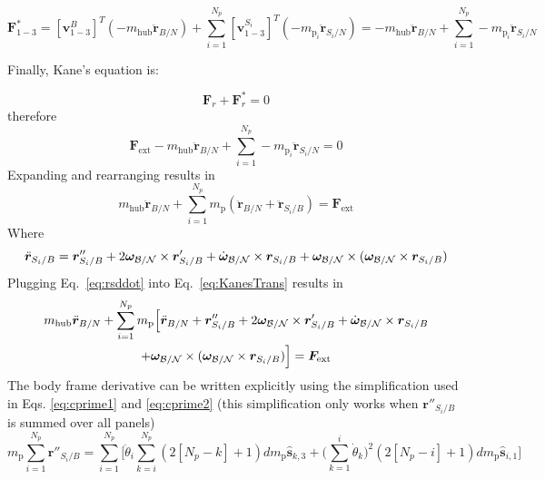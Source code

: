 \documentclass[paper]{aiaaNew}
\begin{document}
\begin{equation}
\bm F^*_{1-3} = [\bm v^{B}_{1-3}]^T (-m_{\text{hub}} \ddot{\bm r}_{B/N}) + \sum\limits_{i=1}^{N_p}[\bm v^{S_i}_{1-3}]^T (-m_{\text{p}_i} \ddot{\bm r}_{S_{i}/N}) = -m_{\text{hub}} \ddot{\bm r}_{B/N} + \sum\limits_{i=1}^{N_p} -m_{\text{p}_i}\ddot{\bm r}_{S_{i}/N}
\end{equation}

Finally, Kane's equation is:

\begin{equation}
\bm F_r + \bm F^*_r = 0
\label{eq:KanesEq}
\end{equation}
therefore
\begin{equation}
\bm F_{\text{ext}} -m_{\text{hub}} \ddot{\bm r}_{B/N} + \sum\limits_{i=1}^{N_p} -m_{\text{p}_i}\ddot{\bm r}_{S_{i}/N} = 0
\end{equation}
Expanding and rearranging results in
\begin{equation}
m_{\text{hub}} \ddot{\bm r}_{B/N}  + \sum\limits_{i=1}^{N_p} m_{\text{p}} (\ddot{\bm r}_{B/N} + \ddot{\bm r}_{S_{i}/B}) = \bm F_{\text{ext}}
\label{eq:KanesTrans}
\end{equation}
Where
\begin{equation}
\ddot{\bm r}_{S_i/B} = \bm{r}''_{S_i/B} + 2 \bm\omega_{\cal B/N} \times \bm{r}'_{S_i/B} +  \dot{\bm\omega}_{\cal B/N} \times \bm{r}_{S_i/B} + \bm\omega_{\cal B/N} \times (\bm\omega_{\cal B/N} \times \bm{r}_{S_i/B})
\label{eq:rsddot}
\end{equation}
Plugging Eq.~\eqref{eq:rsddot} into Eq.~\eqref{eq:KanesTrans} results in
\begin{multline}
m_{\text{hub}} \ddot{\bm r}_{B/N} +  \sum\limits_{i=1}^{N_p} m_{\text{p}} \Big[\ddot{\bm r}_{B/N} +  \bm{r}''_{S_i/B}
+ 2 \bm\omega_{\cal B/N} \times \bm{r}'_{S_i/B} +  \dot{\bm\omega}_{\cal B/N} \times \bm{r}_{S_i/B}
\\ + \bm\omega_{\cal B/N} \times (\bm\omega_{\cal B/N} \times \bm{r}_{S_i/B})\Big] = \bm F_{\text{ext}}
\end{multline}
The body frame derivative can be written explicitly using the simplification used in Eqs. \ref{eq:cprime1} and \ref{eq:cprime2} (this simplification only works when $\bm{r}''_{S_i/B}$ is summed over all panels) 
\begin{equation}
m_{\text{p}} \sum^{N_p}_{i=1} \bm{r}''_{S_i/B} = \sum^{N_p}_{i=1} \Big[ \ddot{\theta}_i \sum^{N_p}_{k=i} (2[N_p-k]+1) d m_{\text{p}} \bm{\hat{s}}_{k,3} + \Big(\sum^{i}_{k=1}\dot{\theta}_k\Big)^2 (2[N_p-i]+1) d m_{\text{p}} \bm{\hat{s}}_{i,1} \Big]
\end{equation}
\end{document}

